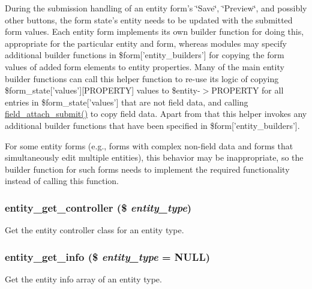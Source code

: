 During the submission handling of an entity form's \char`\"{}Save\char`\"{}, \char`\"{}Preview\char`\"{}, and possibly other buttons, the form state's entity needs to be updated with the submitted form values. Each entity form implements its own builder function for doing this, appropriate for the particular entity and form, whereas modules may specify additional builder functions in \$form\mbox{[}'entity\_\-builders'\mbox{]} for copying the form values of added form elements to entity properties. Many of the main entity builder functions can call this helper function to re-\/use its logic of copying \$form\_\-state\mbox{[}'values'\mbox{]}\mbox{[}PROPERTY\mbox{]} values to \$entity-\/$>$PROPERTY for all entries in \$form\_\-state\mbox{[}'values'\mbox{]} that are not field data, and calling \hyperlink{group__field__attach_ga756e59f651aa870ee79dd488b4e799c8}{field\_\-attach\_\-submit()} to copy field data. Apart from that this helper invokes any additional builder functions that have been specified in \$form\mbox{[}'entity\_\-builders'\mbox{]}.

For some entity forms (e.g., forms with complex non-\/field data and forms that simultaneously edit multiple entities), this behavior may be inappropriate, so the builder function for such forms needs to implement the required functionality instead of calling this function. \hypertarget{common_8inc_ae99d85c4f3144d7211e312e293c3be70}{
\subsubsection[{entity\_\-get\_\-controller}]{\setlength{\rightskip}{0pt plus 5cm}entity\_\-get\_\-controller (\$ {\em entity\_\-type})}}
\label{common_8inc_ae99d85c4f3144d7211e312e293c3be70}
Get the entity controller class for an entity type. \hypertarget{common_8inc_a202e2a1b69e813ef9c48464efeca8ed3}{
\subsubsection[{entity\_\-get\_\-info}]{\setlength{\rightskip}{0pt plus 5cm}entity\_\-get\_\-info (\$ {\em entity\_\-type} = {\ttfamily NULL})}}
\label{common_8inc_a202e2a1b69e813ef9c48464efeca8ed3}
Get the entity info array of an entity type.


